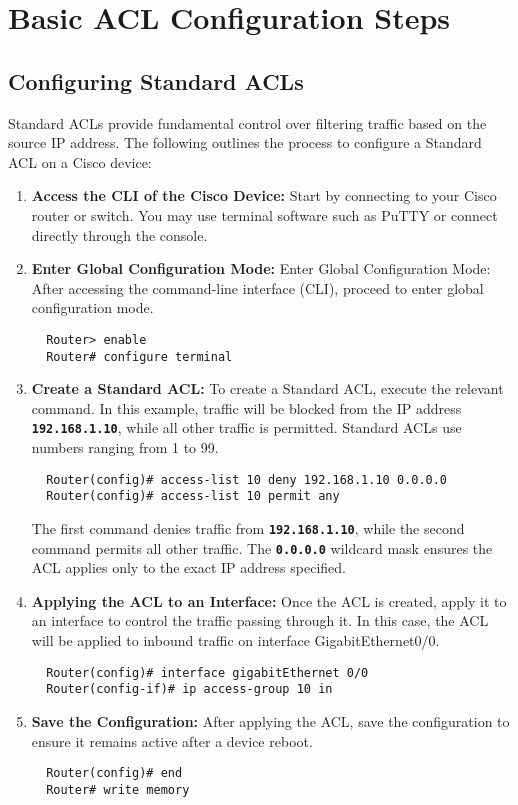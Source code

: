 \documentclass[11pt,a4paper]{article}
\begin{document}
\section*{Basic ACL Configuration Steps}
    \subsection*{Configuring Standard ACLs}
    Standard ACLs provide fundamental control over filtering traffic based on the source IP address. The following outlines the process to configure a Standard ACL on a Cisco device:
  
        \begin{enumerate}
            \item \textbf{Access the CLI of the Cisco Device:} Start by connecting to your Cisco router or switch. You may use terminal software such as PuTTY or connect directly through the console.

            \item \textbf{Enter Global Configuration Mode:} Enter Global Configuration Mode: After accessing the command-line interface (CLI), proceed to enter global configuration mode.

\begin{lstlisting}
  Router> enable
  Router# configure terminal
\end{lstlisting}

            \item \textbf{Create a Standard ACL:} To create a Standard ACL, execute the relevant command. In this example, traffic will be blocked from the IP address \textbf{\lstinline{192.168.1.10}}, while all other traffic is permitted. Standard ACLs use numbers ranging from 1 to 99.
\begin{lstlisting}
  Router(config)# access-list 10 deny 192.168.1.10 0.0.0.0
  Router(config)# access-list 10 permit any
\end{lstlisting}
            The first command denies traffic from \textbf{\lstinline{192.168.1.10}}, while the second command permits all other traffic. The \textbf{\lstinline{0.0.0.0}} wildcard mask ensures the ACL applies only to the exact IP address specified.

            \item \textbf{Applying the ACL to an Interface:} Once the ACL is created, apply it to an interface to control the traffic passing through it. In this case, the ACL will be applied to inbound traffic on interface GigabitEthernet0/0.
\begin{lstlisting}
  Router(config)# interface gigabitEthernet 0/0
  Router(config-if)# ip access-group 10 in
\end{lstlisting}
            \item \textbf{Save the Configuration:} After applying the ACL, save the configuration to ensure it remains active after a device reboot.
\begin{lstlisting}
  Router(config)# end
  Router# write memory
\end{lstlisting}
        \end{enumerate}
    
\end{document}
